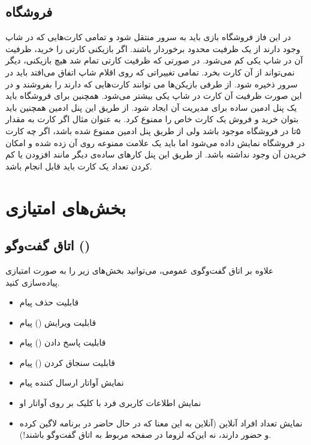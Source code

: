 \documentclass[]{article}
\begin{document}
\subsection*{{\titr فروشگاه}}
در این فاز فروشگاه بازی باید به سرور منتقل شود و تمامی کارت‌هایی که در شاپ وجود دارند از یک ظرفیت محدود برخوردار باشند. اگر بازیکنی کارتی را خرید، ظرفیت آن در شاپ یکی کم می‌شود. در صورتی که ظرفیت کارتی تمام شد هیچ بازیکنی، دیگر نمی‌تواند از آن کارت بخرد. تمامی تغییراتی که روی اقلام شاپ اتفاق می‌افتد باید در سرور ذخیره شود. از طرفی بازیکن‌ها می توانند کارت‌هایی که دارند را بفروشند و در این صورت ظرفیت آن کارت در شاپ یکی بیشتر می‌شود. همچنین برای فروشگاه باید یک پنل ادمین ساده برای مدیریت آن ایجاد شود. از طریق این پنل ادمین همچنین باید بتوان خرید و فروش یک کارت خاص را ممنوع کرد. به عنوان مثال اگر کارت  به مقدار ۵تا در فروشگاه موجود باشد ولی از طریق پنل ادمین ممنوع شده باشد، اگر چه کارت در فروشگاه نمایش داده می‌شود اما باید یک علامت ممنوعه روی آن زده شده و امکان خریدن آن وجود نداشته باشد. از طریق این پنل کارهای ساده‌ی دیگر مانند افزودن یا کم کردن تعداد یک کارت باید قابل انجام باشد.




\section*{{\titr بخش‌های امتیازی}}

\subsection*{{\titr اتاق گفت‌وگو ()}}

علاوه بر اتاق گفت‌و‌گوی عمومی، می‌توانید بخش‌های زیر را به صورت امتیازی پیاده‌سازی کنید.

\begin{itemize}
	\item قابلیت حذف پیام
	\item  قابلیت ویرایش () پیام
	\item قابلیت پاسخ دادن () پیام
	\item قابلیت سنجاق کردن () پیام
	\item نمایش آواتار ارسال کننده پیام
	\item نمایش اطلاعات کاربری فرد با کلیک بر روی آواتار او
	\item نمایش تعداد افراد آنلاین (آنلاین به این معنا که در حال حاضر در برنامه لاگین کرده و حضور دارند، نه این‌که لزوما در صفحه مربوط به اتاق گفت‌وگو باشند!).
\end{itemize}
\end{document}
